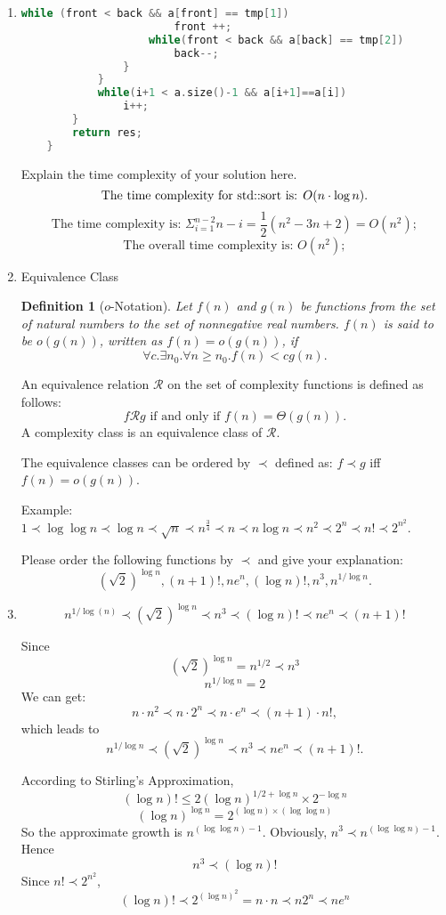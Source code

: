 \documentclass[12pt,a4paper]{article}
\makeatletter
\newtheorem*{solution}{Solution}
\newtheorem{definition}{Definition}
\theoremstyle{definition}
\renewenvironment{solution}[1][Solution] {\par\pushQED{\qed}\normalfont\topsep6\p@\@plus6\p@\relax\trivlist\item[\hskip\labelsep\bfseries#1\@addpunct{.}]\ignorespaces}{\popQED\endtrivlist\@endpefalse} \makeatother
\makeatother
\begin{document}
\begin{enumerate}
\begin{solution}
\begin{lstlisting}[language=C++]
                    while (front < back && a[front] == tmp[1])
                        front ++;
                    while(front < back && a[back] == tmp[2])
                        back--;
                } 
            }
            while(i+1 < a.size()-1 && a[i+1]==a[i])
                i++;
        }
        return res;  
    }
	\end{lstlisting}
Explain the time complexity of your solution here.
$$
	\text{The time complexity for std::sort is: } O(n \cdot \log n). \\
$$
$$
	\text{The time complexity is: } \Sigma_{i=1}^{n-2} n-i = \frac{1}{2}(n^2-3n+2) = O(n^2); 
$$
$$
	\text{The overall time complexity is: } O(n^2); 
$$
\end{solution}

\item Equivalence Class

\begin{definition}[$o$-Notation]
Let $f(n)$ and $g(n)$ be functions from the set of natural numbers to the set of nonnegative real numbers. $f(n)$ is said to be $o(g(n))$, written as $f(n)=o(g(n))$, if
$$\forall c.\exists n_{0}.\forall n\ge n_{0}.f(n)<c g(n).$$
\end{definition}

An equivalence relation $\mathcal{R}$ on the set of complexity functions is defined as follows: $$f\mathcal{R}g \mbox{ if and only if }
f(n)=\Theta(g(n)).$$ A complexity class is an equivalence class of $\mathcal{R}$.

The equivalence classes can be ordered by $\prec$ defined as: $f\prec g$ iff $f(n)=o(g(n))$.

{\color{purple}Example: $1 \prec \log \log n \prec \log n \prec \sqrt{n} \prec n^{\frac{3}{4}} \prec n \prec n \log n \prec n^2 \prec 2^n \prec n! \prec 2^{n^2}$.}

Please order the following functions by $\prec$ and give your explanation: $$(\sqrt{2})^{\log n}, (n+1)!, 
ne^n, (\log n)!, n^3,  n^{1/\log n}.$$




\begin{solution}
	$$
		n^{1/ \log(n)} \prec (\sqrt{2})^{\log n}   \prec n^3  \prec (\log n)!\prec  ne^n \prec   (n+1)! 
	$$

	Since 
	$$
		(\sqrt{2})^{\log n}=n^{1/2}\prec n^3
	$$
	$$
		n^{1/\log n}=2
	$$
	We can get: 
	$$
		n \cdot n^2\prec n \cdot 2^n\prec n \cdot e^n\prec (n+1) \cdot n!,
	$$
	which leads to
	$$
		n^{1/\log n}\prec (\sqrt{2})^{\log n}\prec n^3\prec ne^n\prec (n+1)!.
	$$

	According to Stirling's Approximation,
	$$
		(\log n)! \leq 2(\log n)^{1/2+\log n} \times 2^{-\log n}
	$$
	$$
		(\log n)^{\log n} = 2^{(\log n) \times (\log \log n)}
	$$
	So the approximate growth is $n^{(\log \log n)-1}$. Obviously, $n^3 \prec n^{(\log \log n)-1}$. Hence
	$$
		n^3 \prec (\log n)!
	$$
	Since $n! \prec 2^{n^2}$,
	$$
		(\log n)! \prec 2^{(\log n)^2} = n \cdot n \prec n2^n \prec ne^n
	$$
	
\end{solution}

\end{enumerate}

\end{document}
